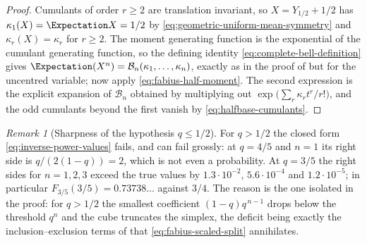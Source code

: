 \documentclass[11pt,a4paper,oneside,openany]{book}
\theoremstyle{definition}
\theoremstyle{remark}
\newtheorem{remark}[remark]{Remark}
\begin{document}
\begin{proof}
Cumulants of order $r\ge2$ are translation invariant, so $X=Y_{1/2}+1/2$ has
$\kappa_1(X)=\Expectation X=1/2$ by \eqref{eq:geometric-uniform-mean-symmetry} and
$\kappa_r(X)=\kappa_r$ for $r\ge2$.  The moment generating function is the exponential of
the cumulant generating function, so the defining identity
\eqref{eq:complete-bell-definition} gives
$\Expectation(X^n)=\mathcal B_n(\kappa_1,\ldots,\kappa_n)$, exactly as in the proof of
 but for the uncentred variable; now apply
\eqref{eq:fabius-half-moment}.  The second expression is the explicit expansion of
$\mathcal B_n$ obtained by multiplying out $\exp\bigl(\sum_r\kappa_rt^r/r!\bigr)$, and the
odd cumulants beyond the first vanish by \eqref{eq:halfbase-cumulants}.
\end{proof}

\begin{remark}[Sharpness of the hypothesis $q\le1/2$]\label{rem:inverse-power-sharpness}
For $q>1/2$ the closed form \eqref{eq:inverse-power-values} fails, and can fail grossly:
at $q=4/5$ and $n=1$ its right side is $q/(2(1-q))=2$, which is not even a probability.
At $q=3/5$ the right sides for $n=1,2,3$ exceed the true values by
$1.3\cdot10^{-2}$, $5.6\cdot10^{-4}$ and $1.2\cdot10^{-5}$; in particular
$F_{3/5}(3/5)=0.73738\ldots$ against $3/4$.  The reason is the one isolated in the proof:
for $q>1/2$ the smallest coefficient $(1-q)q^{\,n-1}$ drops below the threshold $q^n$ and
the cube truncates the simplex, the deficit being exactly the inclusion--exclusion terms
of  that \eqref{eq:fabius-scaled-split} annihilates.
\end{remark}
\end{document}

